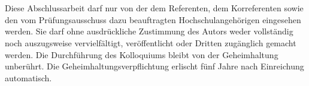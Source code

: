 \chapter*{}
\thispagestyle{empty}

Diese Abschlussarbeit darf nur von der dem Referenten, dem Korreferenten sowie den vom Prüfungsausschuss dazu beauftragten Hochschulangehörigen eingesehen werden. Sie darf ohne ausdrückliche Zustimmung des Autors
weder vollständig noch auszugsweise vervielfältigt, veröffentlicht oder Dritten zugänglich gemacht werden. Die Durchführung des Kolloquiums bleibt von der Geheimhaltung unberührt. Die Geheimhaltungsverpflichtung erlischt fünf Jahre nach Einreichung automatisch.
